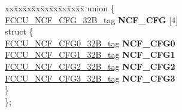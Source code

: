 \begin{DoxyCompactItemize}
\begin{tabbing}
\end{tabbing}\item 
\mbox{\label{structFCCU__struct__tag_aea2dee1992a79d445c0f40208f7a68c1}} 
\begin{tabbing}
xx\=xx\=xx\=xx\=xx\=xx\=xx\=xx\=xx\=\kill
union \{\\
\>\mbox{\hyperlink{unionFCCU__NCF__CFG__32B__tag}{FCCU\_NCF\_CFG\_32B\_tag}} {\bfseries NCF\_CFG} \mbox{[}4\mbox{]}\\
\mbox{\label{unionFCCU__struct__tag_1_1_0D2088_a06e595fbda71462b238ec2957c97c491}} 
\>struct \{\\
\>\>\mbox{\hyperlink{unionFCCU__NCF__CFG0__32B__tag}{FCCU\_NCF\_CFG0\_32B\_tag}} {\bfseries NCF\_CFG0}\\
\>\>\mbox{\hyperlink{unionFCCU__NCF__CFG1__32B__tag}{FCCU\_NCF\_CFG1\_32B\_tag}} {\bfseries NCF\_CFG1}\\
\>\>\mbox{\hyperlink{unionFCCU__NCF__CFG2__32B__tag}{FCCU\_NCF\_CFG2\_32B\_tag}} {\bfseries NCF\_CFG2}\\
\>\>\mbox{\hyperlink{unionFCCU__NCF__CFG3__32B__tag}{FCCU\_NCF\_CFG3\_32B\_tag}} {\bfseries NCF\_CFG3}\\
\>\} \\
\}; \\


\end{tabbing}
\end{DoxyCompactItemize}
